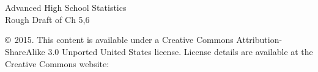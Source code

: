 \chapter*{}
Advanced High School Statistics\\
Rough Draft of Ch 5,6
\vfill


\noindent $\copyright$ 2015. This content is available under a Creative Commons Attribution-ShareAlike 3.0 Unported United States license. License details are available at the Creative Commons website:  \\


